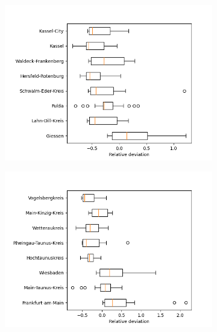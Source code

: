 \begin{figure}[h]
	\centering
	\begin{subfigure}[b]{0.4\textwidth}
		\centering
		\includegraphics[width=\textwidth]{./figures/76d/deviation_box76_1.png}	
	\end{subfigure}
	\begin{subfigure}[b]{0.4\textwidth}
		\centering
		\includegraphics[width=\textwidth]{./figures/76d/deviation_box76_2.png}	
	\end{subfigure}
	\begin{subfigure}[b]{0.4\textwidth}
		\centering

\end{subfigure}
\end{figure}
